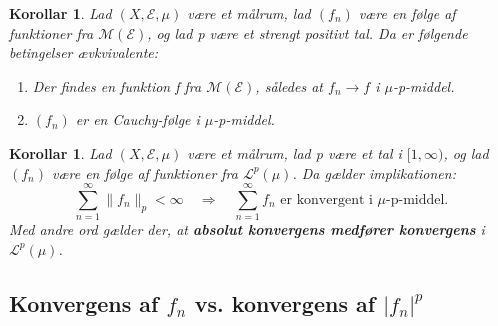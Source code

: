 \documentclass{article}
\newcommand{\1}{\mathbbm{1}}
\newcommand{\lclass}{\mathcal{L}}
\newtheorem{corollary}[theorem]{Korollar}
\theoremstyle{boxed}
\begin{document}
\begin{theorem-box}
    \begin{corollary}
        Lad $(X,\mathcal{E}, \mu)$ være et målrum, lad $(f_n)$ være en følge af funktioner fra $\mathcal{M}(\mathcal{E})$, og lad p være et strengt positivt tal. Da er følgende betingelser ævkvivalente:
        \begin{enumerate}
            \item[\textnormal{(i)}] Der findes en funktion f fra $\mathcal{M}(\mathcal{E})$, således at $f_n\rightarrow f$ i $\mu$-p-middel.
            \item[\textnormal{(ii)}] $(f_n)$ er en Cauchy-følge i $\mu$-p-middel.   
        \end{enumerate}
    \end{corollary}
\end{theorem-box}
\begin{theorem-box}
    \begin{corollary}
        Lad $(X,\mathcal{E},\mu)$ være et målrum, lad p være et tal i $[1,\infty)$, og lad $(f_n)$ være en følge af funktioner fra $\lclass^p(\mu)$. Da gælder implikationen:
        $$\sum_{n=1}^{\infty}\|f_n\|_p<\infty\quad\Longrightarrow\quad \sum_{n=1}^{\infty}f_n\text{ er konvergent i }\mu\text{-p-middel.}$$
        Med andre ord gælder der, at \textbf{absolut konvergens medfører konvergens} i $\lclass^p(\mu)$.
    \end{corollary}
\end{theorem-box}
\subsection{Konvergens af $f_n$ vs. konvergens af $|f_n|^p$}
\end{document}
